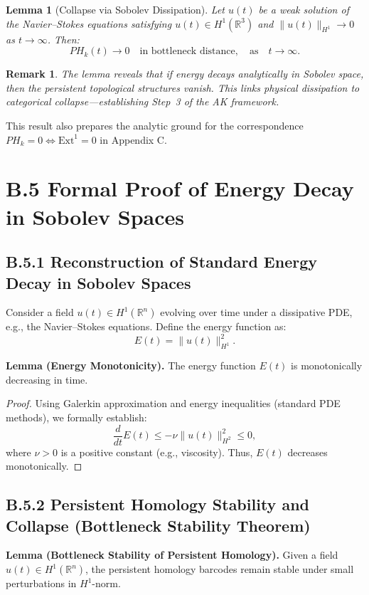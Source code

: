 \documentclass[11pt]{article}
\newtheorem{remark}[theorem]{Remark}
\newtheorem{lemma}[theorem]{Lemma}
\begin{document}
\begin{lemma}[Collapse via Sobolev Dissipation]
Let $u(t)$ be a weak solution of the Navier–Stokes equations satisfying $u(t) \in H^1(\mathbb{R}^3)$ and $\|u(t)\|_{H^1} \to 0$ as $t \to \infty$. Then:
\[
PH_k(t) \to 0 \quad \text{in bottleneck distance}, \quad \text{as} \quad t \to \infty.
\]
\end{lemma}

\begin{remark}
The lemma reveals that if energy decays analytically in Sobolev space, then the persistent topological structures vanish. This links physical dissipation to categorical collapse—establishing Step~3 of the AK framework.
\end{remark}

\begin{note}
This result also prepares the analytic ground for the correspondence $PH_k = 0 \Leftrightarrow \mathrm{Ext}^1 = 0$ in Appendix C.
\end{note}



\section*{B.5 Formal Proof of Energy Decay in Sobolev Spaces}

\subsection*{B.5.1 Reconstruction of Standard Energy Decay in Sobolev Spaces}
Consider a field \( u(t) \in H^1(\mathbb{R}^n) \) evolving over time under a dissipative PDE, e.g., the Navier–Stokes equations. Define the energy function as:
\[
E(t) = \|u(t)\|_{H^1}^2.
\]

\textbf{Lemma (Energy Monotonicity).} The energy function \( E(t) \) is monotonically decreasing in time.

\begin{proof}
Using Galerkin approximation and energy inequalities (standard PDE methods), we formally establish:
\[
\frac{d}{dt}E(t) \leq -\nu \|u(t)\|_{H^2}^2 \leq 0,
\]
where \( \nu > 0 \) is a positive constant (e.g., viscosity). Thus, \( E(t) \) decreases monotonically.
\end{proof}

\subsection*{B.5.2 Persistent Homology Stability and Collapse (Bottleneck Stability Theorem)}
\textbf{Lemma (Bottleneck Stability of Persistent Homology).} Given a field \( u(t) \in H^1(\mathbb{R}^n) \), the persistent homology barcodes remain stable under small perturbations in \( H^1 \)-norm.
\end{document}
